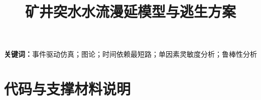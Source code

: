 \documentclass[UTF8,a4paper,12pt]{ctexart}
\title{矿井突水水流漫延模型与逃生方案}
\author{}
\date{}
\newif\ifusereferences
\begin{document}
\maketitle
\thispagestyle{empty}

\begin{abstract}

\end{abstract}

\noindent\textbf{关键词：}事件驱动仿真；图论；时间依赖最短路；单因素灵敏度分析；鲁棒性分析

\clearpage
\setcounter{page}{1}











\ifusereferences
  \begingroup
  \footnotesize
  \linespread{1.0}\selectfont
  \let\cumcmorigbibitem\bibitem
  \renewcommand{\bibitem}[2][]{\cumcmorigbibitem{#2}}
  
  
  \endgroup
\fi

\clearpage
\cumcmappendixsetup
\section{代码与支撑材料说明}

\end{document}
